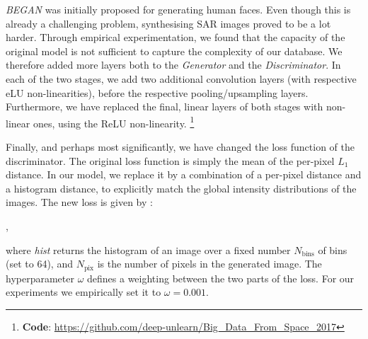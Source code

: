 \documentclass{article}
\begin{document}
\smallskip

\emph{BEGAN} was initially proposed for generating human faces. Even
though this is already a challenging problem, synthesising SAR images
proved to be a lot harder.
%
Through empirical experimentation, we found that the capacity of the
original model is not sufficient to capture the complexity of our
database. We therefore added more layers both to the \emph{Generator}
and the \emph{Discriminator}.
%
In each of the two stages, we add two additional convolution layers
(with respective eLU non-linearities), before the respective
pooling/upsampling layers.
%
Furthermore, we have replaced the final, linear layers of both stages
with non-linear ones, using the ReLU non-linearity.
\footnote{\scriptsize{\textbf{Code}:} \tiny{\url{https://github.com/deep-unlearn/Big_Data_From_Space_2017}}}

\smallskip

\noindent
Finally, and perhaps most significantly, we have changed the loss function of the discriminator.%
The original loss function is simply the mean of the per-pixel \emph{$L_1$} 
distance.
%
In our model, we replace it by a combination of a per-pixel distance
and a histogram distance, to explicitly match the global intensity
distributions of the images.
%
The new loss is given by :

\smallskip

	
	\smallskip
	
	
	\smallskip
		
	\;,	

\smallskip

\noindent
where \emph{hist} returns the histogram of an image over a fixed
number $N_\text{bins}$ of bins (set to 64), and $N_\text{pix}$ is
the number of pixels in the generated image.
%
The hyperparameter $\omega$ defines a weighting between the two parts
of the loss. For our experiments we empirically set it to
$\omega=0.001$.
%
\end{document}
